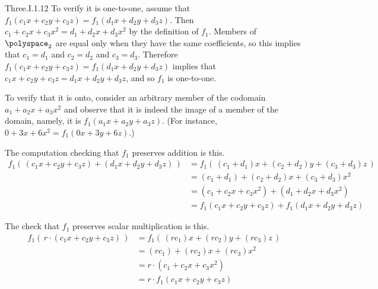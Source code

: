 \begin{ans}{Three.I.1.12}
      To verify it is one-to-one, assume that
       $f_1(c_1x+c_2y+c_3z)=f_1(d_1x+d_2y+d_3z)$.
      Then $c_1+c_2x+c_3x^2=d_1+d_2x+d_3x^2$
      by the definition of $f_1$.
      Members of $\polyspace_2$ are equal only when they have the same
      coefficients, so this implies that
      $c_1=d_1$ and $c_2=d_2$ and $c_3=d_3$.
      Therefore $f_1(c_1x+c_2y+c_3z)=f_1(d_1x+d_2y+d_3z)$ implies that
      $c_1x+c_2y+c_3z=d_1x+d_2y+d_3z$, and so $f_1$ is one-to-one.

      To verify that it is onto, consider an arbitrary member of the codomain
      $a_1+a_2x+a_3x^2$ and observe that
      it is indeed the image of a member of the
      domain, namely, it is $f_1(a_1x+a_2y+a_3z)$.
      (For instance, $0+3x+6x^2=f_1(0x+3y+6z)$.)

      The computation checking that $f_1$ preserves addition is this.
      \begin{align*}
        f_1\left(\,(c_1x+c_2y+c_3z)+(d_1x+d_2y+d_3z)\,\right)
          &=f_1\left(\,(c_1+d_1)x+(c_2+d_2)y+(c_3+d_3)z\,\right)  \\
          &=(c_1+d_1)+(c_2+d_2)x+(c_3+d_3)x^2  \\
          &=(c_1+c_2x+c_3x^2)+(d_1+d_2x+d_3x^2)  \\
          &=f_1(c_1x+c_2y+c_3z)+f_1(d_1x+d_2y+d_3z)
      \end{align*}

      The check that $f_1$ preserves scalar multiplication is this.
      \begin{align*}
        f_1(\,r\cdot (c_1x+c_2y+c_3z)\,)
          &=f_1(\,(rc_1)x+(rc_2)y+(rc_3)z\,)  \\
          &=(rc_1)+(rc_2)x+(rc_3)x^2  \\
          &=r\cdot (c_1+c_2x+c_3x^2)  \\
          &=r\cdot f_1(c_1x+c_2y+c_3z)
      \end{align*}
    
\end{ans}
